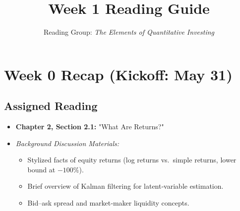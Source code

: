 \documentclass[11pt]{amsart}
\title{Week 1 Reading Guide}
\author{Reading Group: \emph{The Elements of Quantitative Investing}}
\begin{document}
\maketitle

\section{Week 0 Recap (Kickoff: May 31)}
\subsection*{Assigned Reading}
\begin{itemize}[noitemsep,left=0pt]
  \item \textbf{Chapter 2, Section 2.1:} "What Are Returns?"
  \item \emph{Background Discussion Materials:}
    \begin{itemize}[noitemsep,left=2em]
      \item Stylized facts of equity returns (log returns vs.\ simple returns, lower bound at $-100\%$).
      \item Brief overview of Kalman filtering for latent‐variable estimation.
      \item Bid–ask spread and market‐maker liquidity concepts.
    \end{itemize}
\end{itemize}
\end{document}
